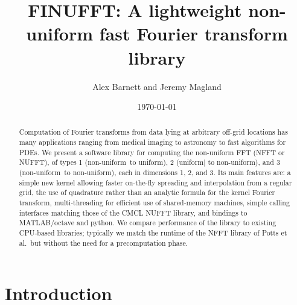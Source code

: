 \documentclass[10pt]{article}
\newcommand{\NU}{{non-uniform}}
\newcommand{\U}{{uniform}}
\begin{document}
\title{FINUFFT: A lightweight non-uniform fast Fourier transform library}
\author{Alex Barnett and Jeremy Magland}
\date{\today}
\maketitle
\begin{abstract}
  Computation of Fourier transforms from data lying at arbitrary
  off-grid locations has many applications ranging from medical
  imaging to astronomy to fast algorithms for PDEs.  We present a
  software library for computing the non-uniform FFT (NFFT or NUFFT),
  of types 1 (\NU\ to \U), 2 (\U| to \NU), and
  3 (\NU\ to \NU), each in dimensions 1, 2, and 3.  Its
  main features are: a simple new kernel allowing faster on-the-fly
  spreading and interpolation from a regular grid, the use of
  quadrature rather than an analytic formula for the kernel Fourier
  transform, multi-threading for efficient use of shared-memory
  machines, simple calling interfaces matching those of the CMCL
  NUFFT library, and bindings to MATLAB/octave and python.  We
  compare performance of the library to existing CPU-based libraries; typically
  we match the runtime of the NFFT library of Potts et al.\ but
  without the need for a precomputation phase.
\end{abstract}




\section{Introduction}
\end{document}
